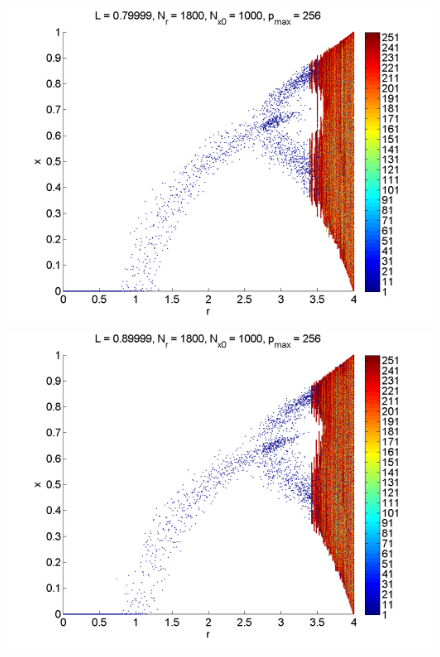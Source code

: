 \begin{figure}[H]
\begin{center}
		\includegraphics[width=.5\textwidth]{figs/rlog_bif_halfs_L_08.png}\hfill
		\includegraphics[width=.5\textwidth]{figs/rlog_bif_halfs_L_09.png}\\
	\end{center}
\end{figure}
